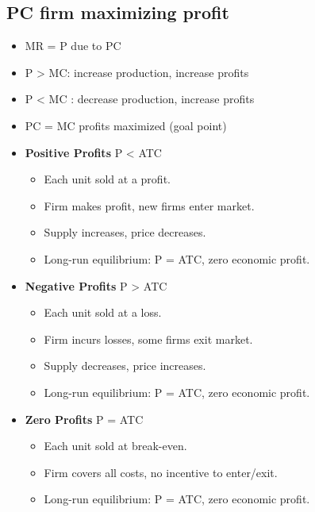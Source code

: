 \documentclass{article}
\begin{document}
\subsection{PC firm maximizing profit}
\begin{itemize}
  \item MR = P due to PC
  \item P > MC: increase production, increase profits
  \item P < MC : decrease production, increase profits
  \item PC = MC profits maximized (goal point)
  \item \textbf{Positive Profits} P < ATC
    \begin{itemize}
      \item Each unit sold at a profit.
        \item Firm makes profit, new firms enter market.
        \item Supply increases, price decreases.
        \item Long-run equilibrium: P = ATC, zero economic profit.
    \end{itemize}
  \item \textbf{Negative Profits} P > ATC
    \begin{itemize}
      \item Each unit sold at a loss.
        \item Firm incurs losses, some firms exit market.
        \item Supply decreases, price increases.
        \item Long-run equilibrium: P = ATC, zero economic profit.
    \end{itemize}
  \item \textbf{Zero Profits} P = ATC
    \begin{itemize}
      \item Each unit sold at break-even.
        \item Firm covers all costs, no incentive to enter/exit.
        \item Long-run equilibrium: P = ATC, zero economic profit.
    \end{itemize}
\end{itemize}
\end{document}
